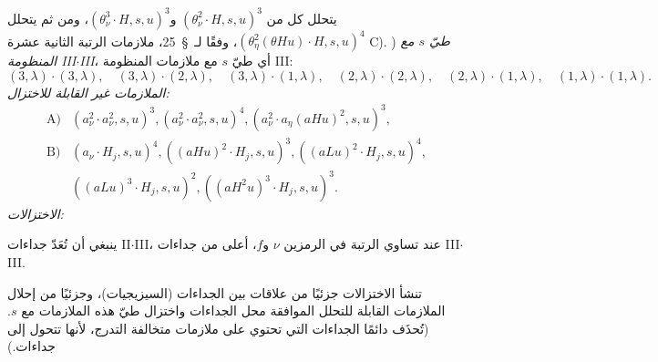 \documentclass[11pt]{article}
\begin{document}
يتحلل كل من $(\theta_\nu^2\cdot H,s,u)^3$ و$(\theta_\nu^3\cdot H,s,u)^3$، ومن ثم يتحلل $(\theta_\eta^2(\theta Hu)\cdot H,s,u)^4$، وفقًا لـ~\S\ 25، ملازمات الرتبة الثانية عشرة C).
) \emph{طيّ $s$ مع المنظومة III$\cdot$III}، أي طيّ $s$ مع ملازمات المنظومة III:
\[
(3,\lambda)\cdot(3,\lambda),\quad (3,\lambda)\cdot(2,\lambda),\quad (3,\lambda)\cdot(1,\lambda),\quad
(2,\lambda)\cdot(2,\lambda),\quad (2,\lambda)\cdot(1,\lambda),\quad
(1,\lambda)\cdot(1,\lambda).
\]
\noindent\emph{الملازمات غير القابلة للاختزال:}
\[
\begin{array}{rl}
\text{A)}&(a_\nu^2\cdot a_\nu^2,s,u)^3,
(a_\nu^2\cdot a_\nu^2,s,u)^4,
(a_\nu^2\cdot a_\eta(aHu)^2,s,u)^3,\\[0.45em]
\text{B)}&(a_\nu\cdot H_j,s,u)^4,
((aHu)^2\cdot H_j,s,u)^3,
((aLu)^2\cdot H_j,s,u)^4,\\[0.25em]
&((aLu)^3\cdot H_j,s,u)^2,
((aH^2u)^3\cdot H_j,s,u)^3.
\end{array}
\]
\noindent\emph{الاختزالات:}

ينبغي أن تُعَدّ جداءات II$\cdot$III، عند تساوي الرتبة في الرمزين $\nu$ و$f$، أعلى من جداءات III$\cdot$III.

تنشأ الاختزالات جزئيًا من علاقات بين الجداءات (السيزيجيات)، وجزئيًا من إحلال الملازمات القابلة للتحلل الموافقة محل الجداءات واختزال طيّ هذه الملازمات مع $s$. (تُحذَف دائمًا الجداءات التي تحتوي على ملازمات متخالفة التدرج، لأنها تتحول إلى جداءات.)
\end{document}
